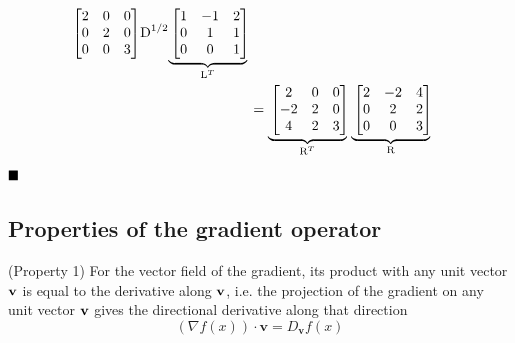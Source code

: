 \documentclass[a4paper]{article}
\numberwithin{equation}{section} %
\newcommand{\myunderbrace}[2]{\mathrlap{\underbrace{\phantom{#1}}_{#2}}
      #1}
\newcommand{\qedblack}{$\hfill\blacksquare$} %
\newcommand{\B}[1]{\textbf{\textup{#1}}} %
\begin{document}
\begin{TheSolution}
\begin{equation*}
\begin{split}
{\begin{bmatrix}
    	2 & 0 & 0\\
       	0 & 2 & 0\\
        0 & 0 & 3
    \end{bmatrix}}
    {\text{D}^{1/2}}
    \myunderbrace{
    \begin{bmatrix}
    	1 & -1 & 2\\
       	0 & 1 & 1\\
        0 & 0 & 1
    \end{bmatrix}}
    {\text{L}^{T}}\\
    &=
    \myunderbrace{
    \begin{bmatrix}
    	2 & 0 & 0\\
        -2 & 2 & 0\\
        4 & 2 & 3
    \end{bmatrix}}
    {\text{R}^{T}}
    \myunderbrace{
    \begin{bmatrix}
    	2 & -2 & 4\\
        0 & 2 & 2\\
        0 & 0 & 3
    \end{bmatrix}}
    {\text{R}}
\end{split}    
\end{equation*}
\qedblack
\end{TheSolution}






\newpage
\subsection{Properties of the gradient operator}
\label{app:app_gradient}

\begin{corollary} (Property 1) For the vector field of the gradient, its product with any unit vector $\B{v}$ is equal to the derivative along $\B{v}$, i.e. the projection of the gradient on any unit vector $\B{v}$ gives the directional derivative along that direction
\begin{equation}
\left( \nabla f\left( x \right) \right)\cdot \mathbf{v}={{D}_{\mathbf{v}}}f\left( x \right)
\label{eq:directional_deriv}
\end{equation}
\end{corollary}
\end{document}
